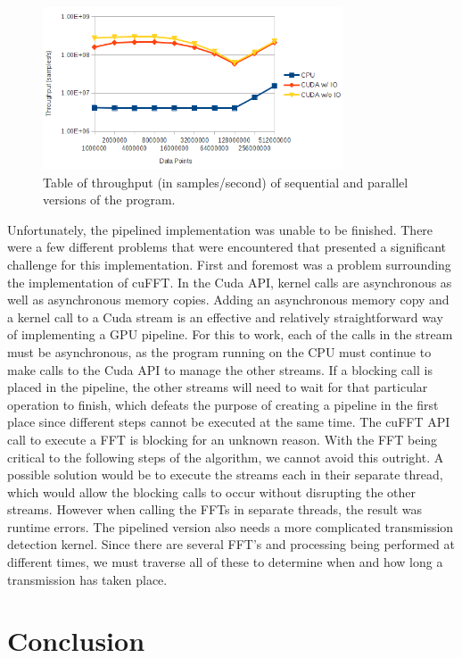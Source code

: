 \documentclass[conference]{IEEEtran}
\begin{document}
\begin{figure}[ht!]
\centering
\includegraphics[width=3.5in]{throughputgraph.png}
\caption{Table of throughput (in samples/second) of sequential and parallel versions of the program.  }
\label{fig:throughputgraph}
\end{figure}

Unfortunately, the pipelined implementation was unable to be finished. There 
were a few different problems that were encountered that presented a significant
challenge for this implementation. First and foremost was a problem surrounding
the implementation of cuFFT. In the Cuda API, kernel calls are asynchronous
as well as asynchronous memory copies. Adding an asynchronous memory copy 
and a kernel call to a Cuda stream is an effective and relatively straightforward
way of implementing a GPU pipeline. For this to work, each of the calls in the
stream must be asynchronous, as the program running on the CPU must continue
to make calls to the Cuda API to manage the other streams. If a blocking call
is placed in the pipeline, the other streams will need to wait for that
particular operation to finish, which defeats the purpose of creating a 
pipeline in the first place since different steps cannot be executed at the 
same time. The cuFFT API call to execute a FFT is blocking for an unknown
reason. With the FFT being critical to the following steps
of the algorithm, we cannot avoid this outright. A possible solution would be to
execute the streams each in their separate thread, which would allow the
blocking calls to occur without disrupting the other streams. However when
calling the FFTs in separate threads, the result was runtime errors. The 
pipelined version also needs a more complicated transmission detection kernel.
Since there are several FFT's and processing being performed at different
times, we must traverse all of these to determine when and how long a
transmission has taken place.

\section{Conclusion}
\end{document}
